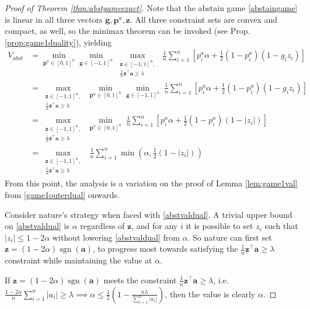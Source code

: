 \documentclass{article}[12pt]
\theoremstyle{named}
\newcommand{\va}{\mathbf{a}}
\newcommand{\vg}{\mathbf{g}}    %
\newcommand{\vp}{\mathbf{p}}
\newcommand{\vz}{\mathbf{z}}
\DeclareMathOperator{\sgn}{sgn}
\newcommand{\abs}[1]{\left| #1 \right|}
\newcommand{\lrp}[1]{\left(#1\right)}
\begin{document}
\begin{proof}[Proof of Theorem \ref{thm:abstgameexact}]
Note that the abstain game \eqref{abstaingame} is linear in all three vectors $\vg, \vp^a, \vz$. 
All three constraint sets are convex and compact, as well, 
so the minimax theorem can be invoked (see Prop. \ref{prop:game1duality}), yielding
\begin{align}
\label{abstvaldual}
V_{abst} &= \min_{\vp^a \in [0,1]^n} \min_{\vg \in [-1,1]^n} \max_{\substack{ \vz \in [-1,1]^n , \\ \frac{1}{n} \vz^\top \va \geq \lambda }}\; 
\frac{1}{n} \sum_{i=1}^n \left[ p_i^a \alpha + \frac{1}{2} \lrp{1 - p_i^a} \lrp{ 1 - g_i z_i } \right] \nonumber \\
&= \max_{\substack{ \vz \in [-1,1]^n , \\ \frac{1}{n} \vz^\top \va \geq \lambda }}\ \min_{\vp^a \in [0,1]^n} \min_{\vg \in [-1,1]^n} \; 
\frac{1}{n} \sum_{i=1}^n \left[ p_i^a \alpha + \frac{1}{2} \lrp{1 - p_i^a} \lrp{ 1 - g_i z_i } \right] \nonumber \\
&= \max_{\substack{ \vz \in [-1,1]^n , \\ \frac{1}{n} \vz^\top \va \geq \lambda }}\ \min_{\vp^a \in [0,1]^n} \; 
\frac{1}{n} \sum_{i=1}^n \left[ p_i^a \alpha + \frac{1}{2} \lrp{1 - p_i^a} \lrp{ 1 - \abs{z_i} } \right] \nonumber \\
&= \max_{\substack{ \vz \in [-1,1]^n , \\ \frac{1}{n} \vz^\top \va \geq \lambda }}\ \; 
\frac{1}{n} \sum_{i=1}^n \min \lrp{ \alpha, \frac{1}{2} \lrp{1 - \abs{z_i}} }
\end{align}
From this point, the analysis is a variation on the proof of Lemma \ref{lem:game1val} 
from \eqref{game1outerdual} onwards.

Consider nature's strategy when faced with \eqref{abstvaldual}. 
A trivial upper bound on \eqref{abstvaldual} is $\alpha$ regardless of $\vz$, 
and for any $i$ it is possible to set $z_i$ such that $\abs{z_i} \leq 1 - 2 \alpha$ 
without lowering \eqref{abstvaldual} from $\alpha$. 
So nature can first set $\vz = (1 - 2 \alpha) \sgn(\va)$, 
to progress most towards satisfying the $\frac{1}{n} \vz^\top \va \geq \lambda$ 
constraint while maintaining the value at $\alpha$. 

If $\vz = (1 - 2 \alpha) \sgn(\va)$ meets the constraint $\frac{1}{n} \vz^\top \va \geq \lambda$, i.e. 
$\frac{1 - 2 \alpha}{n} \sum_{i=1}^n \abs{a_i} \geq \lambda \implies \alpha \leq \frac{1}{2} \lrp{1 - \frac{n\lambda}{\sum_{i=1}^n \abs{a_i}}}$, 
then the value is clearly $\alpha$.


\end{proof}
\end{document}
